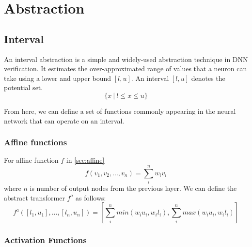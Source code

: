\documentclass[oneside,11pt,dvipsnames]{book}
\begin{document}
\chapter{Abstraction}

\section{Interval}

An interval abstraction is a simple and widely-used abstraction technique in DNN verification. It estimates the over-approximated range of values that a neuron can take using a lower and upper bound $[l, u]$. An interval $[l, u]$ denotes the potential set.
$$\{x \ | \ l \leq x \leq u\}$$

From here, we can define a set of functions commonly appearing in the neural network that can operate on an interval.

\subsection{Affine functions}

For affine function \(f\) in \ref{sec:affine}
\[f(v_1, v_2, ...,v_n) = \sum_{i}^{n}w_iv_i\]
where $n$ is number of output nodes from the previous layer. We can define the abstract transformer \(f^a\) as follows:
\[f^{a}([l_1, u_1],...,[l_n, u_n]) = [\sum_{i}^{n}min(w_iu_i, w_il_i), \sum_{i}^{n}max(w_iu_i, w_il_i)]\]




\subsection{Activation Functions}
\end{document}
